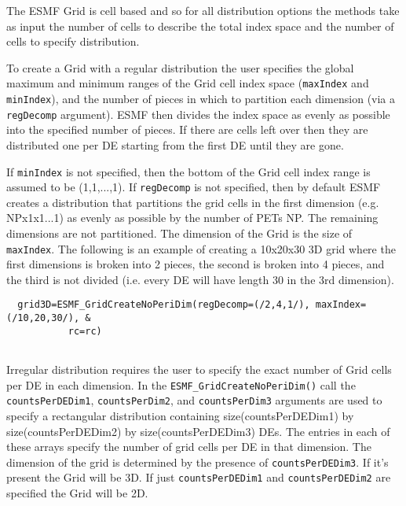    The ESMF Grid is cell based and so for all distribution
   options the methods take as input the number of cells to describe
   the total index space and the number of cells to specify distribution.
  
   To create a Grid
   with a regular distribution the user specifies the global
   maximum and minimum ranges of the Grid cell index space ({\tt maxIndex} and
   {\tt minIndex}), and the number of pieces in which to partition
   each dimension (via a {\tt regDecomp} argument).
   ESMF then divides the index space as evenly as possible
   into the specified number of pieces. If there are cells
   left over then they are distributed one per DE starting from
   the first DE until they are gone.
  
   If {\tt minIndex} is
   not specified, then the bottom of the Grid cell index range is assumed
   to be (1,1,...,1). If {\tt regDecomp} is not specified, then
   by default ESMF creates a distribution that partitions the
   grid cells in the first dimension (e.g. NPx1x1...1) as evenly
   as possible by  the number of PETs NP.
   The remaining dimensions are not partitioned.
   The dimension of the Grid is the size of {\tt maxIndex}.
   The following is an example of creating a 10x20x30 3D grid
   where the first dimensions is broken into 2 pieces, the second
   is broken into 4 pieces, and the third is not divided (i.e. every DE will
   have length 30 in the 3rd dimension). 

 \begin{verbatim}
  grid3D=ESMF_GridCreateNoPeriDim(regDecomp=(/2,4,1/), maxIndex=(/10,20,30/), &
           rc=rc)
 
\end{verbatim}
 

   Irregular distribution requires the user to specify the
   exact number of Grid cells per DE in each dimension.  In the
   {\tt ESMF\_GridCreateNoPeriDim()} call the {\tt countsPerDEDim1},
   {\tt countsPerDim2}, and {\tt countsPerDim3}
   arguments are used to specify a rectangular distribution
   containing size(countsPerDEDim1) by size(countsPerDEDim2) by
   size(countsPerDEDim3) DEs. The entries in each of these arrays
   specify the number of grid cells per DE in that dimension.
   The dimension of the grid is determined by the presence of
   {\tt countsPerDEDim3}.  If it's present the Grid
   will be 3D. If just {\tt countsPerDEDim1} and
   {\tt countsPerDEDim2} are specified the Grid
   will be 2D.
  
